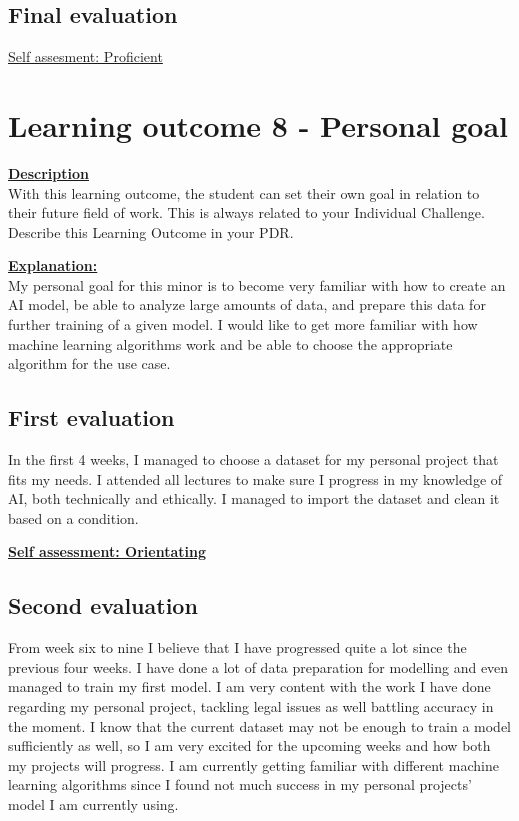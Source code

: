 \documentclass{article}
\begin{document}
\subsection{Final evaluation}
\underline{Self assesment: Proficient}

\section{Learning outcome 8 - Personal goal}
\underline{\textbf{Description}}\\
With this learning outcome, the student can set their own goal in relation to their future field of work.
This is always related to your Individual Challenge. Describe this Learning Outcome in your PDR.

\underline{\textbf{Explanation:}}\\
My personal goal for this minor is to become very familiar with how to create an AI model, be able to analyze large amounts of data,
and prepare this data for further training of a given model. I would like to get more familiar with how machine learning algorithms work 
and be able to choose the appropriate algorithm for the use case.

\subsection{First evaluation}
In the first 4 weeks, I managed to choose a dataset for my personal project that fits my needs. I attended all lectures to make 
sure I progress in my knowledge of AI, both technically and ethically. I managed to import the dataset and clean it based on a condition.

\underline{\textbf{Self assessment: Orientating}}

\subsection{Second evaluation}
From week six to nine I believe that I have progressed quite a lot since the previous four weeks. I have done a lot of data preparation for 
modelling and even managed to train my first model. I am very content with the work I have done regarding my personal project, tackling legal issues 
as well battling accuracy in the moment. I know that the current dataset may not be enough to train a model sufficiently as well, so I am very excited for the 
upcoming weeks and how both my projects will progress. I am currently getting familiar with different machine learning algorithms since I found not much 
success in my personal projects' model I am currently using.
\end{document}
